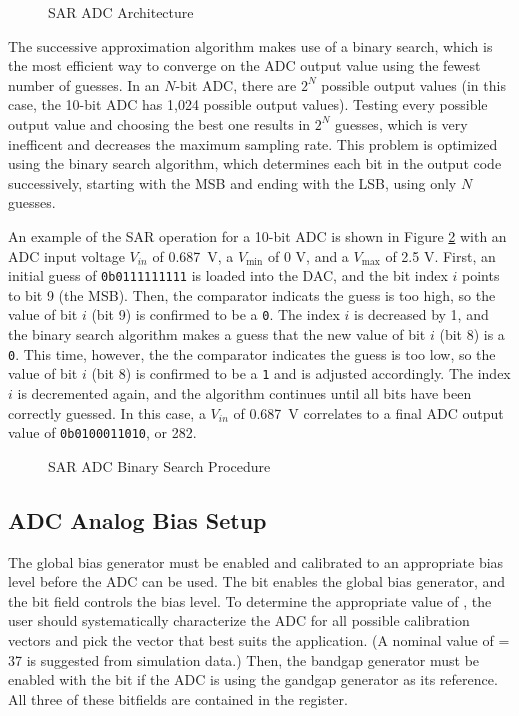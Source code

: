\begin{figure}[htpb]
	\centering
	
	\caption{SAR ADC Architecture}
	\label{fig:sar-adc-diagram}
\end{figure}

The successive approximation algorithm makes use of a binary search, which is the most efficient way to converge on the ADC output value using the fewest number of guesses. In an $N$-bit ADC, there are $2^N$ possible output values (in this case, the 10-bit ADC has 1,024 possible output values). Testing every possible output value and choosing the best one results in $2^N$ guesses, which is very inefficent and decreases the maximum sampling rate. This problem is optimized using the binary search algorithm, which determines each bit in the output code successively, starting with the MSB and ending with the LSB, using only $N$ guesses.

An example of the SAR operation for a 10-bit ADC is shown in Figure \ref{fig:sar-adc-procedure-plot} with an ADC input voltage $V_{in}$ of 0.687~\si{\volt}, a $V_\mathrm{min}$ of 0 V, and a $V_\mathrm{max}$ of 2.5 V. First, an initial guess of \texttt{0b0111111111} is loaded into the DAC, and the bit index $i$ points to bit 9 (the MSB). Then, the comparator indicats the guess is too high, so the value of bit $i$ (bit 9) is confirmed to be a \texttt{0}. The index $i$ is decreased by 1, and the binary search algorithm makes a guess that the new value of bit $i$ (bit 8) is a \texttt{0}. This time, however, the the comparator indicates the guess is too low, so the value of bit $i$ (bit 8) is confirmed to be a \texttt{1} and is adjusted accordingly. The index $i$ is decremented again, and the algorithm continues until all bits have been correctly guessed. In this case, a $V_{in}$ of 0.687~\si{\volt} correlates to a final ADC output value of \texttt{0b0100011010}, or 282.

\begin{figure}[htpb]
	
	\caption{SAR ADC Binary Search Procedure}
	\label{fig:sar-adc-procedure-plot}
\end{figure}



\subsection{ADC Analog Bias Setup}

The global bias generator must be enabled and calibrated to an appropriate bias level before the ADC can be used. The  bit enables the global bias generator, and the  bit field controls the bias level. To determine the appropriate value of , the user should systematically characterize the ADC for all possible calibration vectors and pick the vector that best suits the application. (A nominal value of  = 37 is suggested from simulation data.) Then, the bandgap generator must be enabled with the  bit if the ADC is using the gandgap generator as its reference. All three of these bitfields are contained in the  register.



